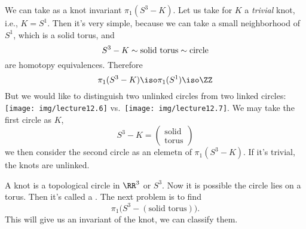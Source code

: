 We can take as a knot invariant $\pi_{1}(S^3-K)$. Let us take for
$K$ a \emph{trivial} knot, i.e., $K=S^1$. Then it's very simple,
because we can take a small neighborhood of $S^1$, which is a
solid torus, and 
\begin{equation}
S^{3}-K\sim\mbox{solid torus}\sim\mbox{circle}
\end{equation}
are homotopy equivalences. Therefore
\begin{equation}
\pi_{1}(S^{3}-K)\iso\pi_{1}(S^1)\iso\ZZ
\end{equation}
But we would like to distinguish two unlinked circles from two
linked circles: \texttt{[image: img/lecture12.6]} vs.\ \texttt{[image: img/lecture12.7]}.
We may take the first circle as $K$,
\begin{equation}
S^{3}-K=\begin{pmatrix}\mbox{solid}\\ \mbox{torus}
\end{pmatrix}
\end{equation}
we then consider the second circle as an elemetn of
$\pi_1(S^3-K)$. If it's trivial, the knots are unlinked.

A knot is a topological circle in $\RR^3$ or $S^3$. Now it is
possible the circle lies on a torus. Then it's called
a .
The next problem is to find
\begin{equation*}
\pi_1\bigl(S^3-(\mbox{solid torus})\bigr).
\end{equation*}
This will give us an invariant of the knot, we can classify them.


